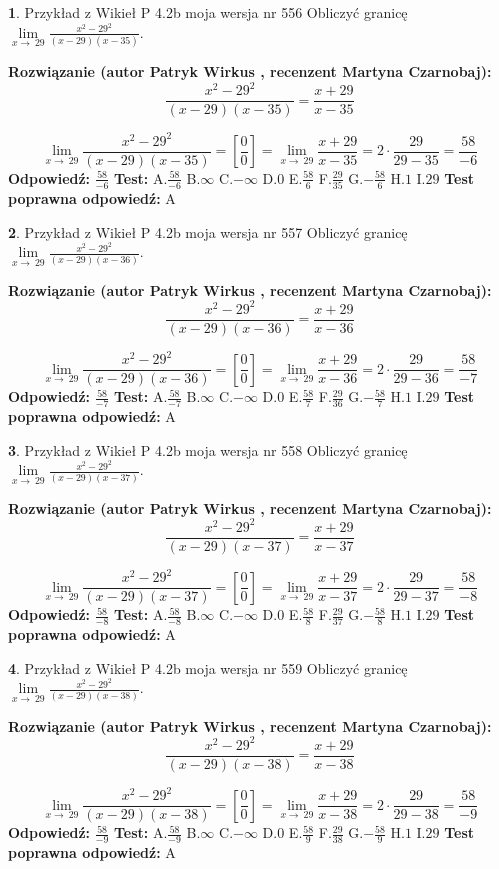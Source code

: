 \documentclass[12pt, a4paper]{article}
\theoremstyle{definition} %
\newtheorem{zad}{}
\newcommand{\zadStart}[1]{\begin{zad}#1\newline}
\newcommand{\zadStop}{\end{zad}}
\newcommand{\rozwStart}[2]{\noindent \textbf{Rozwiązanie (autor #1 , recenzent #2): }\newline}
\newcommand{\rozwStop}{\newline}
\newcommand{\odpStart}{\noindent \textbf{Odpowiedź:}\newline}
\newcommand{\odpStop}{\newline}
\newcommand{\testStart}{\noindent \textbf{Test:}\newline}
\newcommand{\testStop}{\newline}
\newcommand{\kluczStart}{\noindent \textbf{Test poprawna odpowiedź:}\newline}
\newcommand{\kluczStop}{\newline}
\begin{document}
\zadStart{Przykład z Wikieł P 4.2b moja wersja nr 556}
Obliczyć granicę $\lim\limits_{x\to\ 29}\frac{x^{2}-29^{2}}{(x-29)(x-35)}$.
\zadStop
\rozwStart{Patryk Wirkus}{Martyna Czarnobaj}
$$\frac{x^{2}-29^{2}}{(x-29)(x-35)}=\frac{x+29}{x-35}$$

$$\lim\limits_{x\to\ 29}\frac{x^{2}-29^{2}}{(x-29)(x-35)}=[\frac{0}{0}]=\lim\limits_{x\to\ 29}\frac{x+29}{x-35}=2 \cdot \frac{29}{29-35} = \frac{58}{-6}$$
\rozwStop
\odpStart
$\frac{58}{-6}$
\odpStop
\testStart
A.$\frac{58}{-6}$
B.$\infty$
C.$-\infty$
D.$0$
E.$\frac{58}{6}$
F.$\frac{29}{35}$
G.$-\frac{58}{6}$
H.$1$
I.$29$
\testStop
\kluczStart
A
\kluczStop



\zadStart{Przykład z Wikieł P 4.2b moja wersja nr 557}
Obliczyć granicę $\lim\limits_{x\to\ 29}\frac{x^{2}-29^{2}}{(x-29)(x-36)}$.
\zadStop
\rozwStart{Patryk Wirkus}{Martyna Czarnobaj}
$$\frac{x^{2}-29^{2}}{(x-29)(x-36)}=\frac{x+29}{x-36}$$

$$\lim\limits_{x\to\ 29}\frac{x^{2}-29^{2}}{(x-29)(x-36)}=[\frac{0}{0}]=\lim\limits_{x\to\ 29}\frac{x+29}{x-36}=2 \cdot \frac{29}{29-36} = \frac{58}{-7}$$
\rozwStop
\odpStart
$\frac{58}{-7}$
\odpStop
\testStart
A.$\frac{58}{-7}$
B.$\infty$
C.$-\infty$
D.$0$
E.$\frac{58}{7}$
F.$\frac{29}{36}$
G.$-\frac{58}{7}$
H.$1$
I.$29$
\testStop
\kluczStart
A
\kluczStop



\zadStart{Przykład z Wikieł P 4.2b moja wersja nr 558}
Obliczyć granicę $\lim\limits_{x\to\ 29}\frac{x^{2}-29^{2}}{(x-29)(x-37)}$.
\zadStop
\rozwStart{Patryk Wirkus}{Martyna Czarnobaj}
$$\frac{x^{2}-29^{2}}{(x-29)(x-37)}=\frac{x+29}{x-37}$$

$$\lim\limits_{x\to\ 29}\frac{x^{2}-29^{2}}{(x-29)(x-37)}=[\frac{0}{0}]=\lim\limits_{x\to\ 29}\frac{x+29}{x-37}=2 \cdot \frac{29}{29-37} = \frac{58}{-8}$$
\rozwStop
\odpStart
$\frac{58}{-8}$
\odpStop
\testStart
A.$\frac{58}{-8}$
B.$\infty$
C.$-\infty$
D.$0$
E.$\frac{58}{8}$
F.$\frac{29}{37}$
G.$-\frac{58}{8}$
H.$1$
I.$29$
\testStop
\kluczStart
A
\kluczStop



\zadStart{Przykład z Wikieł P 4.2b moja wersja nr 559}
Obliczyć granicę $\lim\limits_{x\to\ 29}\frac{x^{2}-29^{2}}{(x-29)(x-38)}$.
\zadStop
\rozwStart{Patryk Wirkus}{Martyna Czarnobaj}
$$\frac{x^{2}-29^{2}}{(x-29)(x-38)}=\frac{x+29}{x-38}$$

$$\lim\limits_{x\to\ 29}\frac{x^{2}-29^{2}}{(x-29)(x-38)}=[\frac{0}{0}]=\lim\limits_{x\to\ 29}\frac{x+29}{x-38}=2 \cdot \frac{29}{29-38} = \frac{58}{-9}$$
\rozwStop
\odpStart
$\frac{58}{-9}$
\odpStop
\testStart
A.$\frac{58}{-9}$
B.$\infty$
C.$-\infty$
D.$0$
E.$\frac{58}{9}$
F.$\frac{29}{38}$
G.$-\frac{58}{9}$
H.$1$
I.$29$
\testStop
\kluczStart
A
\kluczStop
\end{document}
